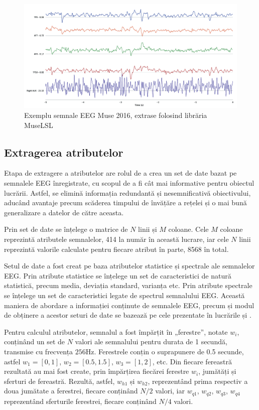 \begin{figure}[ht]
\centering
\includegraphics[width=\textwidth, keepaspectratio]{fig/cap3/museEEGplot.png}
\caption{Exemplu semnale EEG Muse 2016, extrase folosind librăria MuseLSL}
\label{fig:muse_eeg_sample}
\end{figure}

\subsection{Extragerea atributelor} 
Etapa de extragere a atributelor are rolul de a crea un set de date bazat pe semnalele EEG înregistrate, cu scopul de a fi cât mai informative pentru obiectul lucrării. Astfel, se elimină informația redundantă și nesemnificativă obiectivului, aducând avantaje precum scăderea timpului de învățăre a rețelei și o mai bună generalizare a datelor de către aceasta.

Prin set de date se înțelege o matrice de $N$ linii și $M$ coloane. Cele $M$ coloane reprezintă atributele semnalelor, 414 la număr în această lucrare, iar cele $N$ linii reprezintă valorile calculate pentru fiecare atribut în parte, 8568 în total.

Setul de date a fost creat pe baza atributelor statistice și spectrale ale semnalelor EEG. Prin atribute statistice se înțelege un set de caracteristici de natură statistică, precum media, deviația standard, varianța etc. Prin atribute spectrale se înțelege un set de caracteristici legate de spectrul semnalului EEG. Această maniera de abordare a informației conținute de semnalele EEG, precum și modul de obținere a acestor seturi de date se bazează pe cele prezentate în lucrările \cite{eeg-cnn:2020} și \cite{eeg:2018}.

Pentru calculul atributelor, semnalul a fost împărțit în „ferestre”, notate $w_i$, conținând un set de $N$ valori ale semnalului pentru durata de 1 secundă, transmise cu frecvența $256\si{\hertz}$. Ferestrele conțin o suprapunere de 0.5 secunde, astfel $w_1=[0,1]$, $w_2=[0.5,1.5]$, $w_3=[1,2]$, etc. Din fiecare fereastră rezultată au mai fost create, prin împărțirea fiecărei ferestre $w_i$, jumătăți și sferturi de fereastră. Rezultă, astfel, $w_{h1}$ și $w_{h2}$, reprezentând prima respectiv a doua jumătate a ferestrei, fiecare conținând $N/2$ valori, iar $w_{q1}$, $w_{q2}$, $w_{q3}$, $w_{q4}$ reprezentând sferturile ferestrei, fiecare conținând $N/4$ valori.

